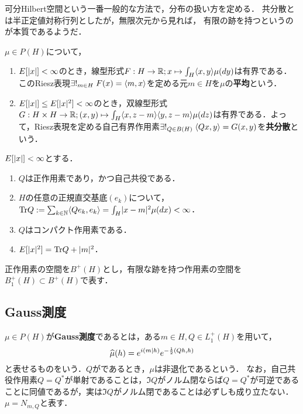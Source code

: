 \documentclass[uplatex,dvipdfmx]{jsreport}
\begin{document}
\begin{tcolorbox}[colframe=ForestGreen, colback=ForestGreen!10!white,breakable,colbacktitle=ForestGreen!40!white,coltitle=black,fonttitle=\bfseries\sffamily,
title=]
    可分Hilbert空間という一番一般的な方法で，分布の扱い方を定める．
    共分散とは半正定値対称行列としたが，無限次元から見れば，
    有限の跡を持つというのが本質であるようだ．
\end{tcolorbox}

\begin{definition}
    $\mu\in P(H)$について，
    \begin{enumerate}
        \item $E[\lvert x\rvert]<\infty$のとき，線型形式$F:H\to\mathbb{R};x\mapsto\int_H\langle x,y\rangle\mu(dy)$は有界である．このRiesz表現$\exists!_{m\in H}\;F(x)=\langle m,x\rangle$を定める元$m\in H$を$\mu$の\textbf{平均}という．
        \item $E[\lvert x\rvert]\le E[\lvert x\rvert^2]<\infty$のとき，双線型形式$G:H\times H\to\mathbb{R};(x,y)\mapsto\int_H\langle x,z-m\rangle\langle y,z-m\rangle\mu(dz)$は有界である．よって，Riesz表現を定める自己有界作用素$\exists!_{Q\in B(H)}\;\langle Qx,y\rangle=G(x,y)$を\textbf{共分散}という．
    \end{enumerate}
\end{definition}

\begin{lemma}[共分散作用素の性質]
    $E[\lvert x\rvert]<\infty$とする．
    \begin{enumerate}
        \item $Q$は正作用素であり，かつ自己共役である．
        \item $H$の任意の正規直交基底$(e_k)$について，$\mathrm{Tr} Q:=\sum_{k\in\mathbb{N}}\langle Qe_k,e_k\rangle=\int_H\lvert x-m\rvert^2\mu(dx)<\infty$．
        \item $Q$はコンパクト作用素である．
        \item $E[\lvert x\rvert^2]=\mathrm{Tr} Q+\lvert m\rvert^2$．
    \end{enumerate}
\end{lemma}

\begin{notation}
    正作用素の空間を$B^+(H)$とし，有限な跡を持つ作用素の空間を$B^+_1(H)\subset B^+(H)$で表す．
\end{notation}

\subsection{Gauss測度}

\begin{definition}
    $\mu\in P(H)$が\textbf{Gauss測度}であるとは，ある$m\in H,Q\in L^+_1(H)$を用いて，
    \[\widehat{\mu}(h)=e^{i(m|h)}e^{-\frac{1}{2}(Qh,h)}\]
    と表せるものをいう．$Q$がであるとき，$\mu$は非退化であるという．
    なお，自己共役作用素$Q=Q^*$が単射であることは，$\Im Q$がノルム閉ならば$Q=Q^*$が可逆であることに同値であるが，実は$\Im Q$がノルム閉であることは必ずしも成り立たない．
    $\mu=N_{m,Q}$と表す．
\end{definition}
\end{document}
